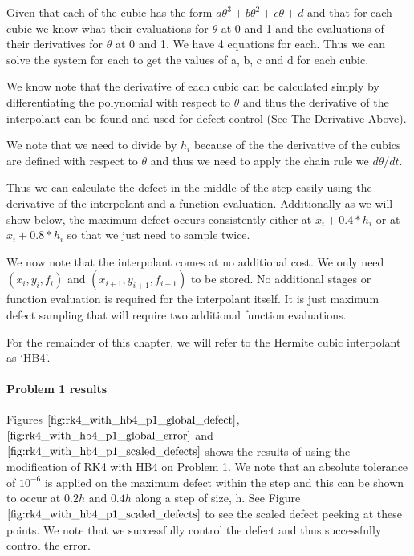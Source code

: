 \documentclass{article}
\begin{document}
Given that each of the cubic has the form $a\theta^3 + b\theta^2 + c\theta + d$ and that for each cubic we know what their evaluations for $\theta$ at 0 and 1 and the evaluations of their derivatives for $\theta$ at 0 and 1. We have 4 equations for each. Thus we can solve the system for each to get the values of a, b, c and d for each cubic.

We know note that the derivative of each cubic can be calculated simply by differentiating the polynomial with respect to $\theta$ and thus the derivative of the interpolant can be found and used for defect control (See The Derivative Above).

We note that we need to divide by $h_i$ because of the the derivative of the cubics are defined with respect to $\theta$ and thus we need to apply the chain rule we $d\theta/dt$.

Thus we can calculate the defect in the middle of the step easily using the derivative of the interpolant and a function evaluation. Additionally as we will show below, the maximum defect occurs consistently either at $x_i + 0.4*h_i$ or at $x_i + 0.8*h_i$ so that we just need to sample twice.

We now note that the interpolant comes at no additional cost. We only need $(x_i, y_i, f_i)$ and $(x_{i + 1}, y_{i + 1}, f_{i + 1})$ to be stored. No additional stages or function evaluation is required for the interpolant itself. It is just maximum defect sampling that will require two additional function evaluations.

For the remainder of this chapter, we will refer to the Hermite cubic interpolant as `HB4'.

\paragraph{Problem 1 results}
Figures $\ref{fig:rk4_with_hb4_p1_global_defect}$, $\ref{fig:rk4_with_hb4_p1_global_error}$ and $\ref{fig:rk4_with_hb4_p1_scaled_defects}$ shows the results of using the modification of RK4 with HB4 on Problem 1. We note that an absolute tolerance of $10^{-6}$ is applied on the maximum defect within the step and this can be shown to occur at $0.2h$ and $0.4h$ along a step of size, h. See Figure $\ref{fig:rk4_with_hb4_p1_scaled_defects}$ to see the scaled defect peeking at these points. We note that we successfully control the defect and thus successfully control the error.
\end{document}
